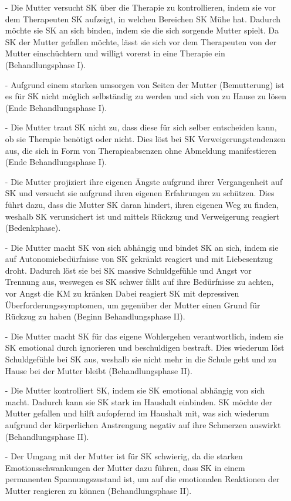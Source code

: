 \begin{itemize}
 \item [-]Die Mutter versucht SK über die Therapie zu kontrollieren, indem sie vor dem Therapeuten SK aufzeigt, in welchen Bereichen SK Mühe hat. Dadurch möchte sie SK an sich binden, indem sie die sich sorgende Mutter spielt. Da SK der Mutter gefallen möchte, lässt sie sich vor dem Therapeuten von der Mutter einschüchtern und willigt vorerst in eine Therapie ein (Behandlungsphase I). 
 \item [-]Aufgrund einem starken umsorgen von Seiten der Mutter (Bemutterung) ist es für SK nicht möglich selbständig zu werden und sich von zu Hause zu lösen (Ende Behandlungsphase I). 
 \item [-]Die Mutter traut SK nicht zu, dass diese für sich selber entscheiden kann, ob sie Therapie benötigt oder nicht. Dies löst bei SK Verweigerungstendenzen aus, die sich in Form von Therapieabsenzen ohne Abmeldung manifestieren (Ende Behandlungsphase I). 
 \item [-] Die Mutter projiziert ihre eigenen Ängste aufgrund ihrer Vergangenheit auf SK und versucht sie aufgrund ihren eigenen Erfahrungen zu schützen. Dies führt dazu, dass die Mutter SK daran hindert, ihren eigenen Weg zu finden, weshalb SK verunsichert ist und mittels Rückzug und Verweigerung reagiert (Bedenkphase). 
 \item [-] Die Mutter macht SK von sich abhängig und bindet SK an sich, indem sie auf Autonomiebedürfnisse von SK gekränkt reagiert und mit Liebesentzug droht. Dadurch löst sie bei SK massive Schuldgefühle und Angst vor Trennung aus, weswegen es SK schwer fällt auf ihre Bedürfnisse zu achten, vor Angst die KM zu kränken Dabei reagiert SK mit depressiven Überforderungssymptomen, um gegenüber der Mutter einen Grund für Rückzug zu haben (Beginn Behandlungsphase II). 
 \item [-] Die Mutter macht SK für das eigene Wohlergehen verantwortlich, indem sie SK emotional durch ignorieren und beschuldigen bestraft. Dies wiederum löst Schuldgefühle bei SK aus, weshalb sie nicht mehr in die Schule geht und zu Hause bei der Mutter bleibt (Behandlungsphase II). 
 \item [-] Die Mutter kontrolliert SK, indem sie SK emotional abhängig von sich macht. Dadurch kann sie SK stark im Haushalt einbinden. SK möchte der Mutter gefallen und hilft aufopfernd im Haushalt mit, was sich wiederum aufgrund der körperlichen Anstrengung negativ auf ihre Schmerzen auswirkt (Behandlungsphase II).
 \item [-] Der Umgang mit der Mutter ist für SK schwierig, da die starken Emotionsschwankungen der Mutter dazu führen, dass SK in einem permanenten Spannungszustand ist, um auf die emotionalen Reaktionen der Mutter reagieren zu können (Behandlungsphase II). 

\end{itemize}
